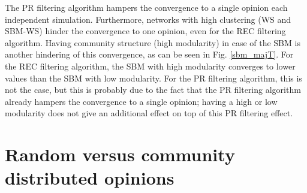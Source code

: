 \documentclass[11 pt , letterpaper , twoside , openright]{book}
\begin{document}
\newline
The PR filtering algorithm hampers the convergence to a single opinion each independent simulation. Furthermore, networks with high clustering (WS and SBM-WS) hinder the convergence to one opinion, even for the REC filtering algorithm. Having community structure (high modularity) in case of the SBM is another hindering of this convergence, as can be seen in Fig. \ref{sbm_majT}.  For the REC filtering algorithm, the SBM with high modularity converges to lower values than the SBM with low modularity. For the PR filtering algorithm, this is not the case, but this is probably due to the fact that the PR filtering algorithm already hampers the convergence to a single opinion; having a high or low modularity does not give an additional effect on top of this PR filtering effect.

\section{Random versus community distributed opinions}
\end{document}
